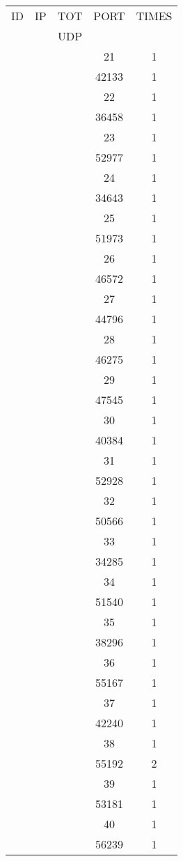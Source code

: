 \documentclass[a4paper]{scrartcl}
\begin{document}
\begin{minipage}[b]{0.5\linewidth}
\begin{tabular}{| c | c | c | c | c |}
\hline
ID & IP & TOT & PORT & TIMES \\ 
   &    & UDP &      &       \\ 
\hline
& & & 21 & 1 \\ & & & 42133 & 1 \\ & & & 22 & 1 \\ & & & 36458 & 1 \\ & & & 23 & 1 \\ & & & 52977 & 1 \\ & & & 24 & 1 \\ & & & 34643 & 1 \\ & & & 25 & 1 \\ & & & 51973 & 1 \\ & & & 26 & 1 \\ & & & 46572 & 1 \\ & & & 27 & 1 \\ & & & 44796 & 1 \\ & & & 28 & 1 \\ & & & 46275 & 1 \\ & & & 29 & 1 \\ & & & 47545 & 1 \\ & & & 30 & 1 \\ & & & 40384 & 1 \\ & & & 31 & 1 \\ & & & 52928 & 1 \\ & & & 32 & 1 \\ & & & 50566 & 1 \\ & & & 33 & 1 \\ & & & 34285 & 1 \\ & & & 34 & 1 \\ & & & 51540 & 1 \\ & & & 35 & 1 \\ & & & 38296 & 1 \\ & & & 36 & 1 \\ & & & 55167 & 1 \\ & & & 37 & 1 \\ & & & 42240 & 1 \\ & & & 38 & 1 \\ & & & 55192 & 2 \\ & & & 39 & 1 \\ & & & 53181 & 1 \\ & & & 40 & 1 \\ & & & 56239 & 1 \\ \hline\end{tabular}\end{minipage} \hfill\begin{minipage}[b]{0.5\linewidth}\begin{tabular}{| c | c | c | c | c |}

\end{tabular}
\end{minipage}
\end{document}
